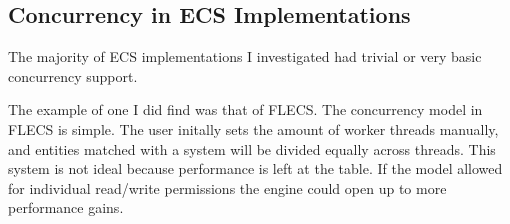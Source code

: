\subsection{Concurrency in ECS Implementations}
The majority of ECS implementations I investigated had trivial or very basic concurrency support.

The example of one I did find was that of FLECS. The concurrency model in FLECS is simple. The user initally sets the amount of worker threads manually, and entities matched with a system will be divided equally across threads. 
This system is not ideal because performance is left at the table. If the model allowed for individual read/write permissions the engine could open up to more performance gains.
 
